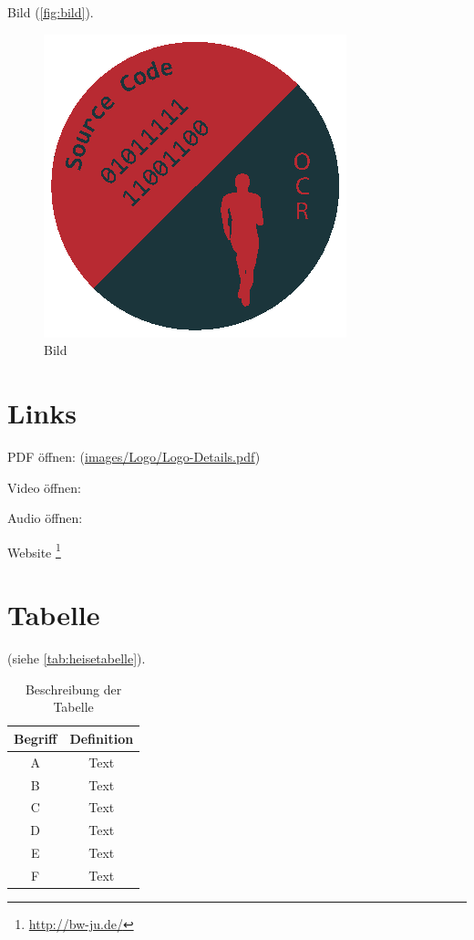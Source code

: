 Bild (\autoref{fig:bild}).
\begin{figure}[!h]%
	\centering
	\includegraphics[width=.55\textwidth]{images/Logo/logo.eps}
	\caption{Bild}\label{fig:bild}%
\end{figure}
 
 
 \section{Links}
 
 PDF öffnen: (\url{images/Logo/Logo-Details.pdf}) 
 
 Video öffnen: 
 
 Audio öffnen: 
 
 Website \footnote{\url{http://bw-ju.de/}}

\section{Tabelle}

(siehe \autoref{tab:heisetabelle}).
\begin{table}[ht]
\centering
\begin{tabular}{cc}
\toprule 
\textbf{Begriff} & \textbf{Definition}\\
\midrule  
A	&	Text \\
B	&	Text \\ 
C	&	Text \\
D	&	Text \\
E	&	Text \\
F	&	Text \\
\bottomrule
\end{tabular}
\caption{Beschreibung der Tabelle}
\label{tab:heisetabelle}
\end{table}


